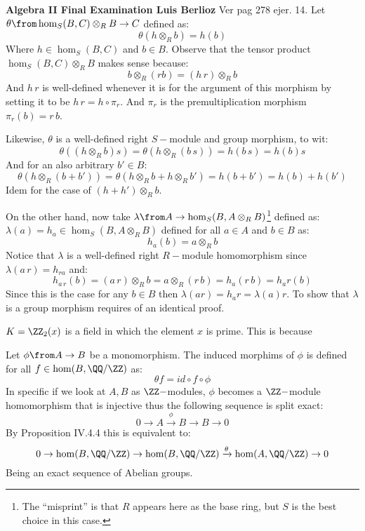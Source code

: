 \noindent\textbf{Algebra II Final Examination \hspace{\fill} Luis Berlioz}
Ver pag 278 ejer. 14.
Let $\theta \from \hom_S(B,C)\otimes_R B \to C$ defined as:
$$\theta (h\otimes_R b)= h(b)$$
Where $h\in \hom_S(B,C)$ and $b\in B$. Observe that the tensor product  $\hom_S(B,C) \otimes_R B$ makes sense because:
$$b \otimes_R(rb) = (h\, r) \otimes_ R b$$
And $h\,r$ is well-defined whenever it is for the argument of this morphism by setting it to be $h\, r =h \circ \pi_r$. And $\pi_r$ is the premultiplication morphism $\pi_r(b)=r\, b$.

Likewise, $\theta$ is a well-defined right $S-$module and group morphism, to wit:
$$\theta((h \otimes_ R b)s)=\theta(h \otimes_ R (b\, s))=h(b\, s)= h(b)s$$
And for an also arbitrary $b'\in B$:
$$\theta(h \otimes_ R (b+b'))=\theta(h \otimes_ R b+ h \otimes_ R b')=h(b+b')=h(b)+h(b')$$
Idem for the case of $(h+h')  \otimes_ R b$.

On the other hand, now take $\lambda \from A \to \hom_S(B,A\otimes_R B)$\footnote{The ``misprint''  is that $R$ appears here as the base ring, but $S$ is the best choice in this case.} defined as: $\lambda (a) = h_a\in \hom_S(B,A\otimes_R B)$ defined for all $a\in A$ and $b\in B$ as: 
$$h_a(b) = a \otimes_R b $$
Notice that $\lambda$ is a well-defined right $R-$module homomorphism since $\lambda(a\,r) = h_{ra}$ and:
$$h_{a\,r}(b) = (a\, r) \otimes_ R b = a \otimes_ R (r\,b)= h_a(r\, b) = h_ar(b)$$
Since this is the case for any $b\in B$ then $\lambda(ar)= h_a r= \lambda(a)r$. To show that $\lambda$ is a group morphism requires of  an identical proof.

$K=\ZZ_2(x)$ is a field in which the element $x$ is prime. This is because 

Let $\phi \from A\to B$ be a monomorphism. The induced morphims of $\phi$ is defined for all $f\in \hom(B,\QQ/\ZZ)$ as: 
$$\theta f= id\circ f\circ \phi$$
In specific if we look at $A,B$ as $\ZZ-$modules,  $\phi$ becomes a $\ZZ-$module homomorphism that is injective thus the following sequence is split exact:
$$0\to A \xrightarrow \phi B \to B \to 0$$
By Proposition IV.4.4 this is equivalent to:
$$0\to \hom(B,\QQ/\ZZ) \to \hom(B,\QQ/\ZZ) \xrightarrow \theta \hom(A,\QQ/\ZZ) \to 0$$
Being an exact sequence of Abelian groups.

